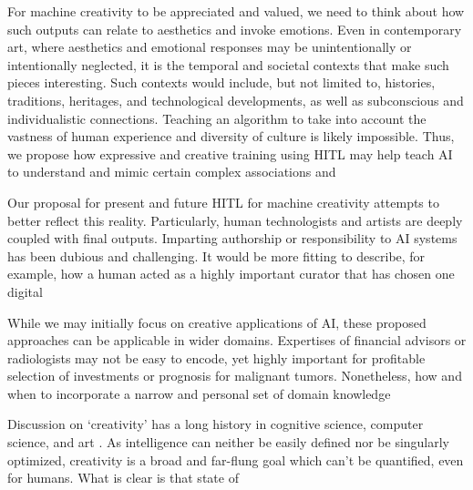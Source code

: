 \documentclass[letterpaper]{article} %
\begin{document}
For machine creativity to be appreciated and valued, we need to think about how such outputs can relate to aesthetics and invoke emotions. Even in contemporary art, where aesthetics and emotional responses may be unintentionally or intentionally neglected, it is the temporal and societal contexts that make such pieces interesting. Such contexts would include, but not limited to, histories, traditions, heritages, and technological developments, as well as subconscious and individualistic connections. Teaching an algorithm to take into account the vastness of human experience and diversity of culture is likely impossible. Thus, we propose how expressive and creative training using HITL may help teach AI to understand and mimic certain complex associations and

Our proposal for present and future HITL for machine creativity attempts to better reflect this reality. Particularly, human technologists and artists are deeply coupled with final outputs. Imparting authorship or responsibility to AI systems has been dubious and challenging. It would be more fitting to describe, for example, how a human acted as a highly important curator that has chosen one digital

While we may initially focus on creative applications of AI, these proposed approaches can be applicable in wider domains. Expertises of financial advisors or radiologists may not be easy to encode, yet highly important for profitable selection of investments or prognosis for malignant tumors. Nonetheless, how and when to incorporate a narrow and personal set of domain knowledge

Discussion on `creativity' has a long history in cognitive science, computer science, and art \cite[e.g.,][]{Cohen1979, Wilson1983, Boden1996, Nake1998}. As intelligence can neither be easily defined nor be singularly optimized, creativity is a broad and far-flung goal which can't be quantified, even for humans. What is clear is that state of

\clearpage

\end{document}
